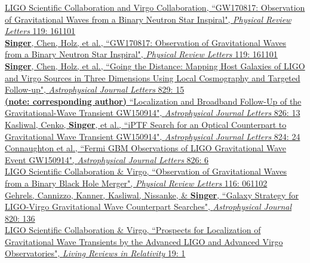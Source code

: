\documentclass[10pt, letterpaper]{article} %
\newcommand{\years}[1]{\marginnote{\scriptsize #1}} %
\begin{document}
%
\years{2017}\href{https://doi.org/10.1103/PhysRevLett.119.161101}{LIGO Scientific Collaboration and Virgo Collaboration, “GW170817: Observation of Gravitational Waves from a Binary Neutron Star Inspiral", \emph{Physical Review Letters} 119: 161101}\\[0.125cm]
%
\years{2017}\href{https://doi.org/10.1103/PhysRevLett.119.161101}{\textbf{Singer}, Chen, Holz, et al., “GW170817: Observation of Gravitational Waves from a Binary Neutron Star Inspiral", \emph{Physical Review Letters} 119: 161101}\\[0.125cm]
%
\years{2016}\href{http://dx.doi.org/10.3847/2041-8205/829/1/L15}{\textbf{Singer}, Chen, Holz, et al., “Going the Distance: Mapping Host Galaxies of LIGO and Virgo Sources in Three Dimensions Using Local Cosmography and Targeted Follow-up", \emph{Astrophysical Journal Letters} 829: 15}\\[0.125cm]
%
\years{2016}\href{http://dx.doi.org/10.3847/2041-8205/826/1/L13}{\textbf{(note: corresponding author)} “Localization and Broadband Follow-Up of the Gravitational-Wave Transient GW150914", \emph{Astrophysical Journal Letters} 826: 13}\\[0.125cm]
%
\years{2016}\href{http://dx.doi.org/10.3847/2041-8205/824/2/L24}{Kasliwal, Cenko, \textbf{Singer}, et al., “iPTF Search for an Optical Counterpart to Gravitational Wave Transient GW150914", \emph{Astrophysical Journal Letters} 824: 24}\\[0.125cm]
%
\years{2016}\href{http://dx.doi.org/10.3847/2041-8205/826/1/L6}{Connaughton et al., “Fermi GBM Observations of LIGO Gravitational Wave Event GW150914", \emph{Astrophysical Journal Letters} 826: 6}\\[0.125cm]
%
%
\years{2016}\href{http://dx.doi.org/10.1103/PhysRevLett.116.061102}{LIGO Scientific Collaboration \& Virgo, “Observation of Gravitational Waves from a Binary Black Hole Merger", \emph{Physical Review Letters} 116: 061102}\\[0.125cm]
% 
\years{2016}\href{http://dx.doi.org/10.3847/0004-637X/820/2/136}{Gehrels, Cannizzo, Kanner, Kasliwal,  Nissanke, \& \textbf{Singer}, “Galaxy Strategy for LIGO-Virgo Gravitational Wave Counterpart Searches", \emph{Astrophysical Journal} 820: 136}\\[0.125cm]
%
\years{2016}\href{http://dx.doi.org/10.1007/lrr-2016-1}{LIGO Scientific Collaboration \& Virgo, “Prospects for Localization of Gravitational Wave Transients by the Advanced LIGO and Advanced Virgo Observatories", \emph{Living Reviews in Relativity} 19: 1}\\[0.125cm]
\end{document}
